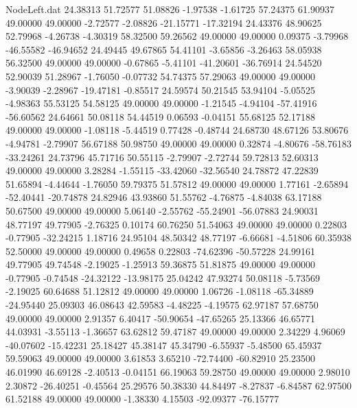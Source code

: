 \begin{filecontents}{NodeLeft.dat}
  24.38313   51.72577   51.08826    -1.97538   -1.61725   57.24375   61.90937   49.00000   49.00000   -2.72577   -2.08826  -21.15771  -17.32194
  24.43376   48.90625   52.79968    -4.26738   -4.30319   58.32500   59.26562   49.00000   49.00000    0.09375   -3.79968  -46.55582  -46.94652
  24.49445   49.67865   54.41101    -3.65856   -3.26463   58.05938   56.32500   49.00000   49.00000   -0.67865   -5.41101  -41.20601  -36.76914
  24.54520   52.90039   51.28967    -1.76050   -0.07732   54.74375   57.29063   49.00000   49.00000   -3.90039   -2.28967  -19.47181   -0.85517
  24.59574   50.21545   53.94104    -5.05525   -4.98363   55.53125   54.58125   49.00000   49.00000   -1.21545   -4.94104  -57.41916  -56.60562
  24.64661   50.08118   54.44519     0.06593   -0.04151   55.68125   52.17188   49.00000   49.00000   -1.08118   -5.44519    0.77428   -0.48744
  24.68730   48.67126   53.80676    -4.94781   -2.79907   56.67188   50.98750   49.00000   49.00000    0.32874   -4.80676  -58.76183  -33.24261
  24.73796   45.71716   50.55115    -2.79907   -2.72744   59.72813   52.60313   49.00000   49.00000    3.28284   -1.55115  -33.42060  -32.56540
  24.78872   47.22839   51.65894    -4.44644   -1.76050   59.79375   51.57812   49.00000   49.00000    1.77161   -2.65894  -52.40441  -20.74878
  24.82946   43.93860   51.55762    -4.76875   -4.84038   63.17188   50.67500   49.00000   49.00000    5.06140   -2.55762  -55.24901  -56.07883
  24.90031   48.77197   49.77905    -2.76325    0.10174   60.76250   51.54063   49.00000   49.00000    0.22803   -0.77905  -32.24215    1.18716
  24.95104   48.50342   48.77197    -6.66681   -4.51806   60.35938   52.50000   49.00000   49.00000    0.49658    0.22803  -74.62396  -50.57228
  24.99161   49.77905   49.74548    -2.19025   -1.25913   59.36875   51.81875   49.00000   49.00000   -0.77905   -0.74548  -24.32122  -13.98175
  25.04242   47.93274   50.08118    -5.73569   -2.19025   60.64688   51.12812   49.00000   49.00000    1.06726   -1.08118  -65.34889  -24.95440
  25.09303   46.08643   42.59583    -4.48225   -4.19575   62.97187   57.68750   49.00000   49.00000    2.91357    6.40417  -50.90654  -47.65265
  25.13366   46.65771   44.03931    -3.55113   -1.36657   63.62812   59.47187   49.00000   49.00000    2.34229    4.96069  -40.07602  -15.42231
  25.18427   45.38147   45.34790    -6.55937   -5.48500   65.45937   59.59063   49.00000   49.00000    3.61853    3.65210  -72.74400  -60.82910
  25.23500   46.01990   46.69128    -2.40513   -0.04151   66.19063   59.28750   49.00000   49.00000    2.98010    2.30872  -26.40251   -0.45564
  25.29576   50.38330   44.84497    -8.27837   -6.84587   62.97500   61.52188   49.00000   49.00000   -1.38330    4.15503  -92.09377  -76.15777

\end{filecontents}
